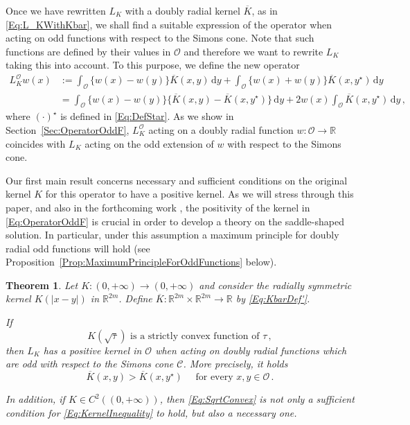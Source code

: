 \documentclass[12pt,reqno]{amsart}
\newtheorem{theorem}{Theorem}[section]
\theoremstyle{definition}
\theoremstyle{remark}
\newcommand{\con}[1]{\mathbb{#1}}
\newcommand{\R}{\con{R}} %
\newcommand{\ccal}{\mathscr{C}}
\newcommand{\ocal}{\mathcal{O}}
\renewcommand{\d}{\,\mathrm{d}} %
\numberwithin{equation}{section}
\begin{document}
Once we have rewritten $L_K$ with a doubly radial kernel $\overline{K}$, as in \eqref{Eq:L_KWithKbar}, we shall find a suitable expression of the operator when acting on odd functions with respect to the Simons cone. Note that such functions are defined by their values in $\ocal$ and therefore we want to rewrite $L_K$ taking this into account. To this purpose, we define the new operator
\begin{equation}
\label{Eq:OperatorOddF}
\begin{split}
L_K^\ocal w (x)  &:= \int_{\ocal} \{w(x) - w(y) \} \overline{K}(x, y) \d y +  \int_{\ocal} \{w(x) + w(y) \} \overline{K}(x, y^\star) \d y \\
&= \int_{\ocal} \{w(x) - w(y) \} \{\overline{K}(x, y) - \overline{K}(x, y^\star)  \} \d y +  2 w(x) \int_{\ocal} \overline{K}(x, y^\star) \d y \,,
\end{split}
\end{equation}
where $(\cdot)^\star$ is defined in \eqref{Eq:DefStar}. As we show in Section~\ref{Sec:OperatorOddF}, $L_K^\ocal$ acting on a doubly radial function $w:\ocal \to \R$ coincides with $L_K$ acting on the odd extension of $w$ with respect to the Simons cone.

Our first main result concerns necessary and sufficient conditions on the original kernel $K$ for this operator to have a positive kernel.  As we will stress through this paper, and also in the forthcoming work \cite{FelipeSanz-Perela:IntegroDifferentialII}, the positivity of the kernel in \eqref{Eq:OperatorOddF} is crucial in order to develop a theory on the saddle-shaped solution. In particular, under this assumption a maximum principle for doubly radial odd functions will hold (see Proposition~\ref{Prop:MaximumPrincipleForOddFunctions} below).

\begin{theorem}
	\label{Th:SufficientNecessaryConditions}
	Let $K:(0,+\infty) \to (0,+\infty)$ and consider the radially symmetric kernel $K(|x-y|)$ in $\R^{2m}$. Define $\overline{K} : \R^{2m}\times \R^{2m} \to \R$ by \eqref{Eq:KbarDef'}.
	
	If 
	\begin{equation}
	\label{Eq:SqrtConvex}	
	K(\sqrt{\tau}) \text{ is a strictly convex function of }\tau\,,
	\end{equation}
	then $L_K$ has a positive kernel in $\ocal$ when acting on doubly radial functions which are odd with respect to the Simons cone $\ccal$. More precisely, it holds
	\begin{equation}
	\label{Eq:KernelInequality}
	\overline{K}(x,y) > \overline{K}(x, y^\star) \quad \text{ for every }x,y \in \ocal\,.
	\end{equation}
	
	In addition, if $K\in C^2((0,+\infty))$, then \eqref{Eq:SqrtConvex} is not only a sufficient condition for \eqref{Eq:KernelInequality} to hold, but also a necessary one.
\end{theorem}
\end{document}
